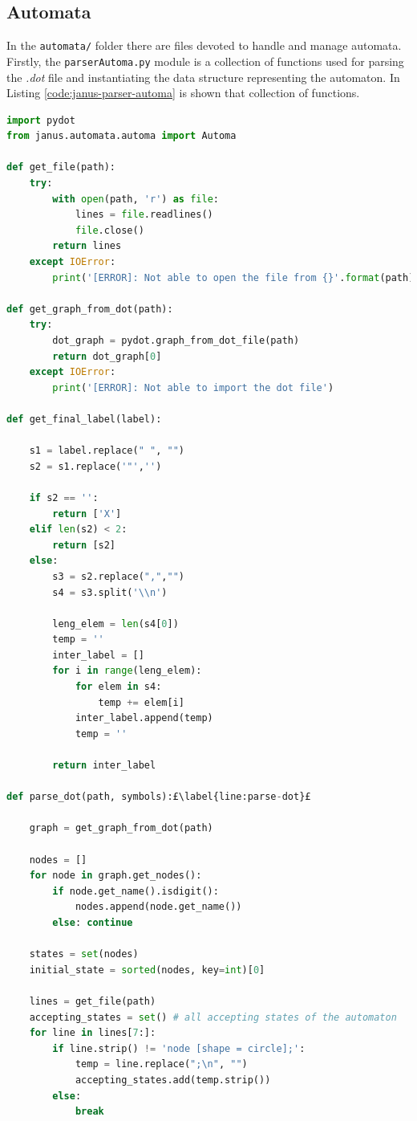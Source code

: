 \subsection{Automata}\label{sec:janus-impl-automa}
In the \texttt{automata/} folder there are files devoted to handle and manage automata. Firstly, the \texttt{parserAutoma.py} module is a collection of functions used for parsing the \textit{.dot} file and instantiating the data structure representing the automaton. In Listing \ref{code:janus-parser-automa} is shown that collection of functions.
\begin{lstlisting}[language=Python, style=Python, escapechar = £, label={code:janus-parser-automa}, caption={The \texttt{parserAutoma.py} module}]
import pydot
from janus.automata.automa import Automa

def get_file(path):
    try:
        with open(path, 'r') as file:
            lines = file.readlines()
            file.close()
        return lines
    except IOError:
        print('[ERROR]: Not able to open the file from {}'.format(path))

def get_graph_from_dot(path):
    try:
        dot_graph = pydot.graph_from_dot_file(path)
        return dot_graph[0]
    except IOError:
        print('[ERROR]: Not able to import the dot file')

def get_final_label(label):

    s1 = label.replace(" ", "")
    s2 = s1.replace('"','')

    if s2 == '':
        return ['X']
    elif len(s2) < 2:
        return [s2]
    else:
        s3 = s2.replace(",","")
        s4 = s3.split('\\n')

        leng_elem = len(s4[0])
        temp = ''
        inter_label = []
        for i in range(leng_elem):
            for elem in s4:
                temp += elem[i]
            inter_label.append(temp)
            temp = ''

        return inter_label

def parse_dot(path, symbols):£\label{line:parse-dot}£

    graph = get_graph_from_dot(path)

    nodes = []
    for node in graph.get_nodes():
        if node.get_name().isdigit():
            nodes.append(node.get_name())
        else: continue

    states = set(nodes)
    initial_state = sorted(nodes, key=int)[0]

    lines = get_file(path)
    accepting_states = set() # all accepting states of the automaton
    for line in lines[7:]:
        if line.strip() != 'node [shape = circle];':
            temp = line.replace(";\n", "")
            accepting_states.add(temp.strip())
        else:
            break


\end{lstlisting}
